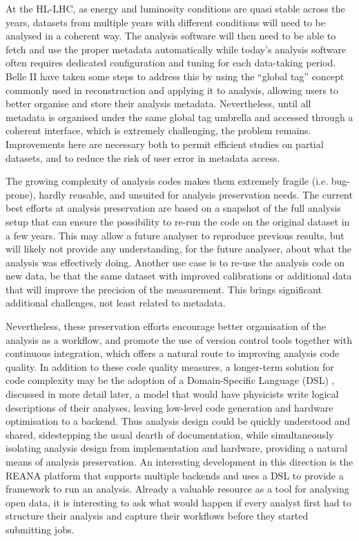 \documentclass[11pt,a4paper]{article}
\begin{document}
At the HL-LHC, as energy and luminosity conditions are quasi stable
across the years, datasets from multiple years with different conditions
will need to be analysed in a coherent way. The analysis software will
then need to be able to fetch and use the proper metadata automatically
while today's analysis software often requires dedicated configuration
and tuning for each data-taking period. Belle II have taken some steps
to address this by using the ``global tag'' concept commonly used in
reconstruction and applying it to analysis, allowing users to better
organise and store their analysis metadata. Nevertheless, until all
metadata is organised under the same global tag umbrella and accessed
through a coherent interface, which is extremely challenging, the
problem remains. Improvements here are necessary both to permit
efficient studies on partial datasets, and to reduce the risk of user
error in metadata access.

The growing complexity of analysis codes makes them extremely fragile
(i.e. bug-prone), hardly reusable, and unsuited for analysis
preservation needs. The current best efforts at analysis preservation
are based on a snapshot of the full analysis setup that can ensure the
possibility to re-run the code on the original dataset in a few years.
This may allow a future analyser to reproduce previous results, but will
likely not provide any understanding, for the future analyser, about
what the analysis was effectively doing. Another use case is to re-use
the analysis code on new data, be that the same dataset with improved
calibrations or additional data that will improve the precision of the
measurement. This brings significant additional challenges, not least
related to metadata.

Nevertheless, these preservation efforts encourage better organisation
of the analysis as a workflow, and promote the use of version control
tools together with continuous integration, which offers a natural route
to improving analysis code quality. In addition to these code quality
measures, a longer-term solution for code complexity may be the adoption
of a Domain-Specific Language (DSL) \cite{Ref10}, discussed in more detail
later, a model that would have physicists write logical descriptions of
their analyses, leaving low-level code generation and hardware
optimisation to a backend. Thus analysis design could be quickly
understood and shared, sidestepping the usual dearth of documentation,
while simultaneously isolating analysis design from implementation and
hardware, providing a natural means of analysis preservation. An
interesting development in this direction is the REANA platform \cite{Ref21}
that supports multiple backends and uses a DSL to provide a framework to
run an analysis. Already a valuable resource as a tool for analysing
open data, it is interesting to ask what would happen if every analyst
first had to structure their analysis and capture their workflows before
they started submitting jobs.
\end{document}
